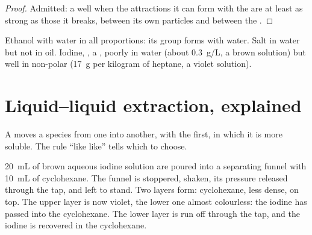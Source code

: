 \begin{proof}
Admitted: a   well when the attractions it can form with
the  are at least as strong as those it breaks, between its own
particles and between the  .
\end{proof}

\begin{example}\label{ex:g11:dissolution:cases}
Ethanol  with water in all proportions: its  group forms
 with water. Salt  in water but not in oil.
Iodine, , a ,  poorly in water (about
\qty{0.3}{g/L}, a brown solution) but well in non-polar 
(\qty{17}{g} per kilogram of heptane, a violet solution).
\end{example}

\section{Liquid--liquid extraction, explained}

A  moves a species from one  into
another,  with the first, in which it is more soluble. The
rule ``like  like'' tells which  to choose.

\begin{inthelab}
\qty{20}{mL} of brown aqueous iodine solution are poured into a
separating funnel with \qty{10}{mL} of cyclohexane. The funnel is
stoppered, shaken, its pressure released through the tap, and left to
stand. Two layers form: cyclohexane, less dense, on top. The upper layer
is now violet, the lower one almost colourless: the iodine has passed
into the cyclohexane. The lower layer is run off through the tap, and
the iodine is recovered in the cyclohexane.
\end{inthelab}

